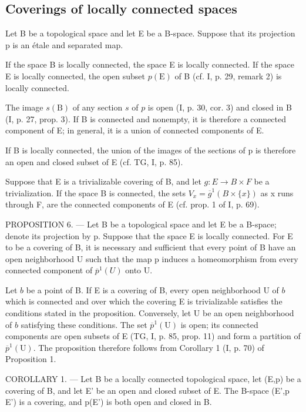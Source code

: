 \subsection{Coverings of locally connected spaces}

Let B be a topological space and let E be a B-space. Suppose that its projection p is an étale and separated map.

If the space B is locally connected, the space E is locally connected. If the space E is locally connected, the open subset \(p(\mathrm{E})\) of B (cf. I, p. 29, remark 2) is locally connected.

The image \(s(\mathrm{B})\) of any section \(s\) of \(p\) is open (I, p. 30, cor. 3) and closed in B (I, p. 27, prop. 3). If B is connected and nonempty, it is therefore a connected component of E; in general, it is a union of connected components of E.

If B is locally connected, the union of the images of the sections of p is therefore an open and closed subset of E (cf. TG, I, p. 85).

Suppose that E is a trivializable covering of B, and let \(g: E \to B \times F\) be a trivialization. If the space B is connected, the sets \(V_{x} = \overline{g}^{1}(B \times \{x\})\) as x runs through F, are the connected components of E (cf. prop. 1 of I, p. 69).

PROPOSITION 6. --- Let B be a topological space and let E be a B-space; denote its projection by p. Suppose that the space E is locally connected. For E to be a covering of B, it is necessary and sufficient that every point of B have an open neighborhood U such that the map p induces a homeomorphism from every connected component of \(\overline{p}^{1}(U)\) onto U.

Let \(b\) be a point of B. If E is a covering of B, every open neighborhood U of \(b\) which is connected and over which the covering E is trivializable satisfies the conditions stated in the proposition. Conversely, let U be an open neighborhood of \(b\) satisfying these conditions. The set \(\overline{p}^{1}(\mathrm{U})\) is open; its connected components are open subsets of E (TG, I, p. 85, prop. 11) and form a partition of \(\overline{p}^{1}(\mathrm{U})\). The proposition therefore follows from Corollary 1 (I, p. 70) of Proposition 1.

COROLLARY 1. — Let B be a locally connected topological space, let (E,p) be a covering of B, and let E' be an open and closed subset of E. The B-space (E',p \textbar{} E') is a covering, and p(E') is both open and closed in B.


